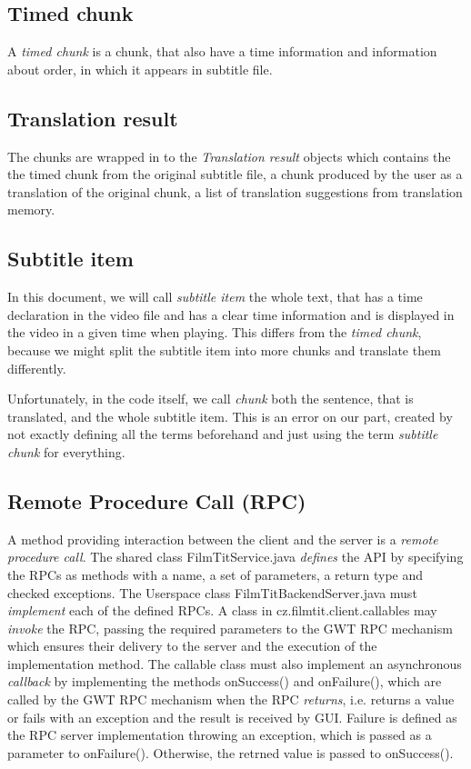 \subsection*{Timed chunk}
A \emph{timed chunk} is a chunk, that also have a time information and information about order, in which it appears in subtitle file.

\subsection*{Translation result}
The chunks are wrapped in to the \emph{Translation result} objects which contains the the timed chunk from the original subtitle file, a chunk produced by the user as a translation of the original chunk, a list of translation suggestions from translation memory.

\subsection*{Subtitle item}
In this document, we will call \emph{subtitle item} the whole text, that has a time declaration in the video file and has a clear time information and is displayed in the video in a given time when playing. This differs from the \emph{timed chunk}, because we might split the subtitle item into more chunks and translate them differently.

Unfortunately, in the code itself, we call \emph{chunk} both the sentence, that is translated, and the whole subtitle item. This is an error on our part, created by not exactly defining all the terms beforehand and just using the term \emph{subtitle chunk} for everything.

\subsection*{Remote Procedure Call (RPC)}
A method providing interaction between the client and the server is a \emph{remote procedure call}. The shared class FilmTitService.java \emph{defines} the API by specifying the RPCs as methods with a name, a set of parameters, a return type and checked exceptions. The Userspace class FilmTitBackendServer.java must \emph{implement} each of the defined RPCs. A class in cz.filmtit.client.callables may \emph{invoke} the RPC, passing the required parameters to the GWT RPC mechanism which ensures their delivery to the server and the execution of the implementation method. The callable class must also implement an asynchronous \emph{callback} by implementing the methods onSuccess() and onFailure(), which are called by the GWT RPC mechanism when the RPC \emph{returns}, i.e. returns a value or fails with an exception and the result is received by GUI. Failure is defined as the RPC server implementation throwing an exception, which is passed as a parameter to onFailure(). Otherwise, the retrned value is passed to onSuccess().

